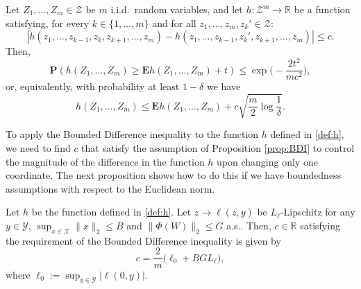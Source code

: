 \begin{proposition}
\label{prop:BDI}
Let $Z_1,\ldots,Z_m\in\mathcal{Z}$ be $m$ i.i.d.\ random variables, and let $h:\mathcal{Z}^m\rightarrow\mathbb{R}$ be a function satisfying, for every $k\in\{1,\ldots,m\}$ and for all $z_1,\ldots,z_m,z_k'\in\mathcal{Z}$:
$$
	| h(z_1,\ldots,z_{k-1},z_k,z_{k+1},\ldots,z_m) - h(z_1,\ldots,z_{k-1},z_k',z_{k+1},\ldots,z_m) | \le c.
$$
Then,
$$
	\mathbf{P}(h(Z_1,\ldots,Z_m) \ge \mathbf{E}h(Z_1,\ldots,Z_m) + t ) \le \exp\bigg(-\frac{2t^2}{m c^2}\bigg),
$$
or, equivalently, with probability at least $1-\delta$ we have
$$
	h(Z_1,\ldots,Z_m) \le \mathbf{E}h(Z_1,\ldots,Z_m) + c\sqrt{\frac{m}{2}\log\frac{1}{\delta}}.
$$
\end{proposition}
To apply the Bounded Difference inequality to the function $h$ defined in \eqref{def:h}, we need to find $c$ that satisfy the assumption of Proposition \ref{prop:BDI} to control the magnitude of the difference in the function $h$ upon changing only one coordinate. The next proposition shows how to do this if we have boundedness assumptions with respect to the Euclidean norm.
\begin{proposition}
\label{prop:c}
Let $h$ be the function defined in \eqref{def:h}. Let $z\rightarrow \ell(z,y)$ be $L_\ell$-Lipschitz for any $y\in\mathcal{Y}$, $\sup_{x\in\mathcal{X}}\|x\|_2 \le B$ and $\|\Phi(W)\|_2\le G$ a.s.. Then, $c\in\mathbb{R}$ satisfying the requirement of the Bounded Difference inequality is given by
$$
	c = \frac{2}{m} \bigg(\ell_0 + BGL_\ell \bigg),
$$
where $\ell_0:=\sup_{y\in\mathcal{Y}} | \ell(0,y) |$.
\end{proposition}

